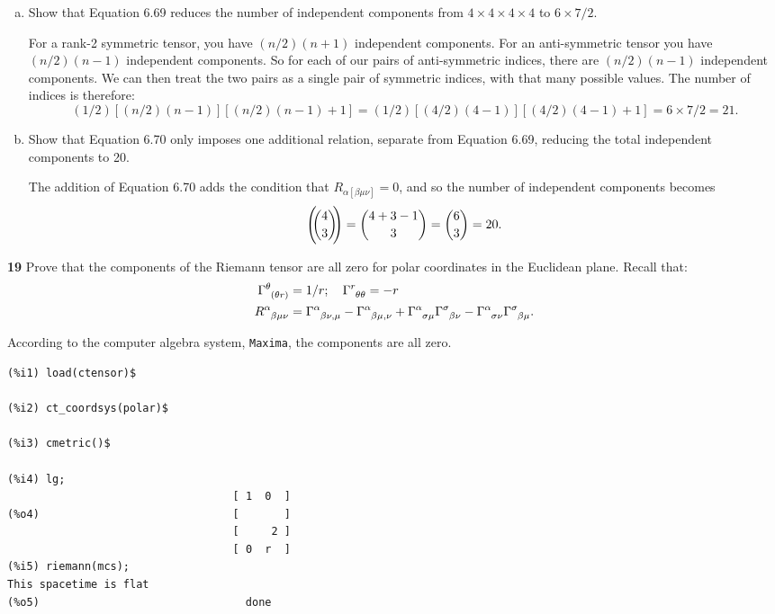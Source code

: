 \documentclass[gr-notes.tex]{subfiles}
\begin{document}
\begin{enumerate}[(a)]
\item Show that Equation 6.69 reduces the number of independent components from $4\times4\times4\times4$ to $6 \times 7 / 2$.

For a rank-2 symmetric tensor, you have $(n/2) (n+1)$ independent components. For an anti-symmetric tensor you have $(n/2) (n-1)$ independent components. So for each of our pairs of anti-symmetric indices, there are $(n/2) (n-1)$ independent components. We can then treat the two pairs as a single pair of symmetric indices, with that many possible values. The number of indices is therefore:
%
\begin{displaymath}
  (1/2) [(n/2) (n-1)] [(n/2) (n-1) + 1] =
  (1/2) [(4/2) (4-1)] [(4/2) (4-1) + 1] =
  6 \times 7 / 2 = 21.
\end{displaymath}

\item Show that Equation 6.70 only imposes one additional relation, separate from Equation 6.69, reducing the total independent components to 20.

The addition of Equation 6.70 adds the condition that $R_{\alpha[\beta\mu\nu]} = 0$, and so the number of independent components becomes
%
\begin{displaymath}
  \qty(\!\!\binom{4}{3}\!\!) =
  \binom{4+3-1}{3} =
  \binom{6}{3} =
  20.
\end{displaymath}

\end{enumerate}


\textbf{19}
Prove that the components of the Riemann tensor are all zero for polar coordinates in the Euclidean plane. Recall that:
%
\begin{align*}
  \tensor{\Gamma}{^\theta_{(\theta r)}} &= 1/r; \quad
  \tensor{\Gamma}{^r_{\theta\theta}} = -r
  \\
  \tensor{R}{^\alpha_{\beta\mu\nu}} &=
  \tensor{\Gamma}{^\alpha_{\beta\nu,\mu}} -
  \tensor{\Gamma}{^\alpha_{\beta\mu,\nu}} +
  \tensor{\Gamma}{^\alpha_{\sigma\mu}} \tensor{\Gamma}{^\sigma_{\beta\nu}} -
  \tensor{\Gamma}{^\alpha_{\sigma\nu}} \tensor{\Gamma}{^\sigma_{\beta\mu}}.
\end{align*}

According to the computer algebra system, \texttt{Maxima}, the components are all zero.

\begin{verbatim}
(%i1) load(ctensor)$

(%i2) ct_coordsys(polar)$

(%i3) cmetric()$

(%i4) lg;
                                   [ 1  0  ]
(%o4)                              [       ]
                                   [     2 ]
                                   [ 0  r  ]
(%i5) riemann(mcs);
This spacetime is flat
(%o5)                                done
\end{verbatim}
\end{document}
